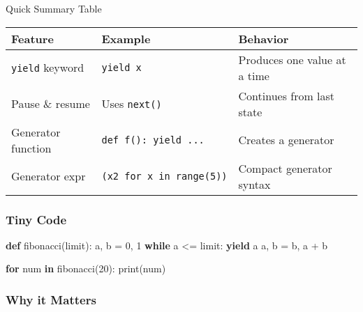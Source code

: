 \documentclass[
  letterpaper,
  DIV=11,
  numbers=noendperiod]{scrreprt}
\newenvironment{Shaded}{\begin{snugshade}}{\end{snugshade}}
\newcommand{\BuiltInTok}[1]{\textcolor[rgb]{0.00,0.23,0.31}{#1}}
\newcommand{\ControlFlowTok}[1]{\textcolor[rgb]{0.00,0.23,0.31}{\textbf{#1}}}
\newcommand{\DecValTok}[1]{\textcolor[rgb]{0.68,0.00,0.00}{#1}}
\newcommand{\KeywordTok}[1]{\textcolor[rgb]{0.00,0.23,0.31}{\textbf{#1}}}
\newcommand{\NormalTok}[1]{\textcolor[rgb]{0.00,0.23,0.31}{#1}}
\newcommand{\OperatorTok}[1]{\textcolor[rgb]{0.37,0.37,0.37}{#1}}
\begin{document}
Quick Summary Table

\begin{longtable}[]{@{}
  >{\raggedright\arraybackslash}p{}
  >{\raggedright\arraybackslash}p{}
  >{\raggedright\arraybackslash}p{}@{}}
\toprule\noalign{}
\begin{minipage}[b]{\linewidth}\raggedright
Feature
\end{minipage} & \begin{minipage}[b]{\linewidth}\raggedright
Example
\end{minipage} & \begin{minipage}[b]{\linewidth}\raggedright
Behavior
\end{minipage} \\
\midrule\noalign{}
\endhead
\bottomrule\noalign{}
\endlastfoot
\texttt{yield} keyword & \texttt{yield\ x} & Produces one value at a
time \\
Pause \& resume & Uses \texttt{next()} & Continues from last state \\
Generator function & \texttt{def\ f():\ yield\ ...} & Creates a
generator \\
Generator expr & \texttt{(x2\ for\ x\ in\ range(5))} & Compact generator
syntax \\
\end{longtable}

\subsubsection{Tiny Code}\label{tiny-code-83}

\begin{Shaded}
\begin{Highlighting}[]
\KeywordTok{def}\NormalTok{ fibonacci(limit):}
\NormalTok{    a, b }\OperatorTok{=} \DecValTok{0}\NormalTok{, }\DecValTok{1}
    \ControlFlowTok{while}\NormalTok{ a }\OperatorTok{\textless{}=}\NormalTok{ limit:}
        \ControlFlowTok{yield}\NormalTok{ a}
\NormalTok{        a, b }\OperatorTok{=}\NormalTok{ b, a }\OperatorTok{+}\NormalTok{ b}

\ControlFlowTok{for}\NormalTok{ num }\KeywordTok{in}\NormalTok{ fibonacci(}\DecValTok{20}\NormalTok{):}
    \BuiltInTok{print}\NormalTok{(num)}
\end{Highlighting}
\end{Shaded}

\subsubsection{Why it Matters}\label{why-it-matters-83}
\end{document}
